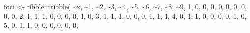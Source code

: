 \documentclass[
  letterpaper,
  DIV=11,
  numbers=noendperiod]{scrreprt}
\newenvironment{Shaded}{\begin{snugshade}}{\end{snugshade}}
\newcommand{\AttributeTok}[1]{\textcolor[rgb]{0.40,0.45,0.13}{#1}}
\newcommand{\DecValTok}[1]{\textcolor[rgb]{0.68,0.00,0.00}{#1}}
\newcommand{\FunctionTok}[1]{\textcolor[rgb]{0.28,0.35,0.67}{#1}}
\newcommand{\NormalTok}[1]{\textcolor[rgb]{0.00,0.23,0.31}{#1}}
\newcommand{\OtherTok}[1]{\textcolor[rgb]{0.00,0.23,0.31}{#1}}
\newcommand{\SpecialCharTok}[1]{\textcolor[rgb]{0.37,0.37,0.37}{#1}}
\newcommand{\StringTok}[1]{\textcolor[rgb]{0.13,0.47,0.30}{#1}}
\begin{document}
\begin{Shaded}
\begin{Highlighting}[]
\NormalTok{foci }\OtherTok{\textless{}{-}}\NormalTok{ tibble}\SpecialCharTok{::}\FunctionTok{tribble}\NormalTok{(}
           \SpecialCharTok{\textasciitilde{}}\NormalTok{x, }\SpecialCharTok{\textasciitilde{}}\StringTok{\textasciigrave{}}\AttributeTok{1}\StringTok{\textasciigrave{}}\NormalTok{, }\SpecialCharTok{\textasciitilde{}}\StringTok{\textasciigrave{}}\AttributeTok{2}\StringTok{\textasciigrave{}}\NormalTok{, }\SpecialCharTok{\textasciitilde{}}\StringTok{\textasciigrave{}}\AttributeTok{3}\StringTok{\textasciigrave{}}\NormalTok{, }\SpecialCharTok{\textasciitilde{}}\StringTok{\textasciigrave{}}\AttributeTok{4}\StringTok{\textasciigrave{}}\NormalTok{, }\SpecialCharTok{\textasciitilde{}}\StringTok{\textasciigrave{}}\AttributeTok{5}\StringTok{\textasciigrave{}}\NormalTok{, }\SpecialCharTok{\textasciitilde{}}\StringTok{\textasciigrave{}}\AttributeTok{6}\StringTok{\textasciigrave{}}\NormalTok{, }\SpecialCharTok{\textasciitilde{}}\StringTok{\textasciigrave{}}\AttributeTok{7}\StringTok{\textasciigrave{}}\NormalTok{, }\SpecialCharTok{\textasciitilde{}}\StringTok{\textasciigrave{}}\AttributeTok{8}\StringTok{\textasciigrave{}}\NormalTok{, }\SpecialCharTok{\textasciitilde{}}\StringTok{\textasciigrave{}}\AttributeTok{9}\StringTok{\textasciigrave{}}\NormalTok{,}
           \DecValTok{1}\NormalTok{,   }\DecValTok{0}\NormalTok{,   }\DecValTok{0}\NormalTok{,   }\DecValTok{0}\NormalTok{,   }\DecValTok{0}\NormalTok{,   }\DecValTok{0}\NormalTok{,   }\DecValTok{0}\NormalTok{,   }\DecValTok{0}\NormalTok{,   }\DecValTok{0}\NormalTok{,   }\DecValTok{0}\NormalTok{,}
           \DecValTok{2}\NormalTok{,   }\DecValTok{1}\NormalTok{,   }\DecValTok{1}\NormalTok{,   }\DecValTok{1}\NormalTok{,   }\DecValTok{0}\NormalTok{,   }\DecValTok{0}\NormalTok{,   }\DecValTok{0}\NormalTok{,   }\DecValTok{0}\NormalTok{,   }\DecValTok{1}\NormalTok{,   }\DecValTok{0}\NormalTok{,}
           \DecValTok{3}\NormalTok{,   }\DecValTok{1}\NormalTok{,   }\DecValTok{1}\NormalTok{,   }\DecValTok{1}\NormalTok{,   }\DecValTok{0}\NormalTok{,   }\DecValTok{0}\NormalTok{,   }\DecValTok{0}\NormalTok{,   }\DecValTok{1}\NormalTok{,   }\DecValTok{1}\NormalTok{,   }\DecValTok{1}\NormalTok{,}
           \DecValTok{4}\NormalTok{,   }\DecValTok{0}\NormalTok{,   }\DecValTok{1}\NormalTok{,   }\DecValTok{1}\NormalTok{,   }\DecValTok{0}\NormalTok{,   }\DecValTok{0}\NormalTok{,   }\DecValTok{0}\NormalTok{,   }\DecValTok{0}\NormalTok{,   }\DecValTok{1}\NormalTok{,   }\DecValTok{0}\NormalTok{,}
           \DecValTok{5}\NormalTok{,   }\DecValTok{0}\NormalTok{,   }\DecValTok{1}\NormalTok{,   }\DecValTok{1}\NormalTok{,   }\DecValTok{0}\NormalTok{,   }\DecValTok{0}\NormalTok{,   }\DecValTok{0}\NormalTok{,   }\DecValTok{0}\NormalTok{,   }\DecValTok{0}\NormalTok{,   }\DecValTok{0}\NormalTok{,}

\end{Highlighting}
\end{Shaded}
\end{document}
